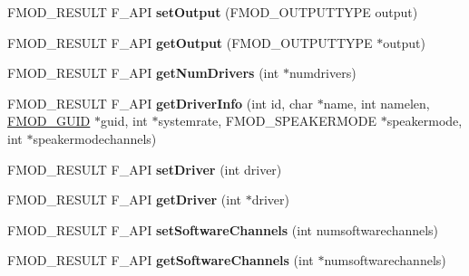 \begin{DoxyCompactItemize}
\item 
\hypertarget{class_f_m_o_d_1_1_system_a97cba04b9a36251e4443aaeba23f2d45}{F\+M\+O\+D\+\_\+\+R\+E\+S\+U\+L\+T F\+\_\+\+A\+P\+I {\bfseries set\+Output} (F\+M\+O\+D\+\_\+\+O\+U\+T\+P\+U\+T\+T\+Y\+P\+E output)}\label{class_f_m_o_d_1_1_system_a97cba04b9a36251e4443aaeba23f2d45}

\item 
\hypertarget{class_f_m_o_d_1_1_system_a3abd8e368b7b220b761fd885ba150485}{F\+M\+O\+D\+\_\+\+R\+E\+S\+U\+L\+T F\+\_\+\+A\+P\+I {\bfseries get\+Output} (F\+M\+O\+D\+\_\+\+O\+U\+T\+P\+U\+T\+T\+Y\+P\+E $\ast$output)}\label{class_f_m_o_d_1_1_system_a3abd8e368b7b220b761fd885ba150485}

\item 
\hypertarget{class_f_m_o_d_1_1_system_aabd75260613afffc7ef0650ac62ef2f4}{F\+M\+O\+D\+\_\+\+R\+E\+S\+U\+L\+T F\+\_\+\+A\+P\+I {\bfseries get\+Num\+Drivers} (int $\ast$numdrivers)}\label{class_f_m_o_d_1_1_system_aabd75260613afffc7ef0650ac62ef2f4}

\item 
\hypertarget{class_f_m_o_d_1_1_system_ac3e42c5e184343d930850b4894112eb9}{F\+M\+O\+D\+\_\+\+R\+E\+S\+U\+L\+T F\+\_\+\+A\+P\+I {\bfseries get\+Driver\+Info} (int id, char $\ast$name, int namelen, \hyperlink{struct_f_m_o_d___g_u_i_d}{F\+M\+O\+D\+\_\+\+G\+U\+I\+D} $\ast$guid, int $\ast$systemrate, F\+M\+O\+D\+\_\+\+S\+P\+E\+A\+K\+E\+R\+M\+O\+D\+E $\ast$speakermode, int $\ast$speakermodechannels)}\label{class_f_m_o_d_1_1_system_ac3e42c5e184343d930850b4894112eb9}

\item 
\hypertarget{class_f_m_o_d_1_1_system_a2ce18295f0e062054e1f8b9421788683}{F\+M\+O\+D\+\_\+\+R\+E\+S\+U\+L\+T F\+\_\+\+A\+P\+I {\bfseries set\+Driver} (int driver)}\label{class_f_m_o_d_1_1_system_a2ce18295f0e062054e1f8b9421788683}

\item 
\hypertarget{class_f_m_o_d_1_1_system_aeba7030e04c4604da112264e3ddbb8e6}{F\+M\+O\+D\+\_\+\+R\+E\+S\+U\+L\+T F\+\_\+\+A\+P\+I {\bfseries get\+Driver} (int $\ast$driver)}\label{class_f_m_o_d_1_1_system_aeba7030e04c4604da112264e3ddbb8e6}

\item 
\hypertarget{class_f_m_o_d_1_1_system_ad12789aa16134fb66520aca1cb1419c6}{F\+M\+O\+D\+\_\+\+R\+E\+S\+U\+L\+T F\+\_\+\+A\+P\+I {\bfseries set\+Software\+Channels} (int numsoftwarechannels)}\label{class_f_m_o_d_1_1_system_ad12789aa16134fb66520aca1cb1419c6}

\item 
\hypertarget{class_f_m_o_d_1_1_system_a210d30f8df72c80d31bc38f5a8e116d0}{F\+M\+O\+D\+\_\+\+R\+E\+S\+U\+L\+T F\+\_\+\+A\+P\+I {\bfseries get\+Software\+Channels} (int $\ast$numsoftwarechannels)}\label{class_f_m_o_d_1_1_system_a210d30f8df72c80d31bc38f5a8e116d0}


\end{DoxyCompactItemize}
